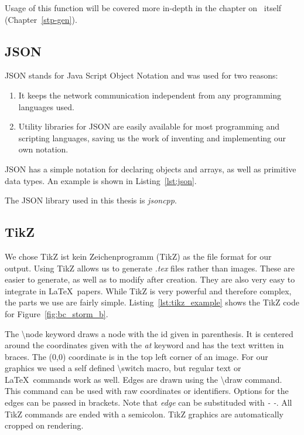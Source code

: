 Usage of this function will be covered more in-depth in the chapter on \tool\ itself (Chapter~\ref{stp-gen}).
\subsection*{JSON}
\label{json}
JSON stands for Java Script Object Notation and was used for two reasons:
\begin{enumerate}
    \item It keeps the network communication independent from any programming languages used.
    \item Utility libraries for JSON are easily available for most programming and scripting languages, saving us the work of inventing and implementing our own notation.
\end{enumerate}
JSON has a simple notation for declaring objects and arrays, as well as primitive data types.
An example is shown in Listing~\ref{lst:json}.

The JSON library used in this thesis is \textit{jsoncpp}\cite{jsoncpp}.

\subsection*{TikZ}
\label{tikz}
We chose TikZ ist kein Zeichenprogramm (TikZ)\cite{tikz} as the file format for our output.
Using TikZ allows us to generate \textit{.tex} files rather than images.
These are easier to generate, as well as to modify after creation.
They are also very easy to integrate in \LaTeX\ papers.
While TikZ is very powerful and therefore complex, the parts we use are fairly simple.
Listing~\ref{lst:tikz_example} shows the TikZ code for Figure~\ref{fig:bc_storm_b}.

The \textbackslash node keyword draws a node with the id given in parenthesis.
It is centered around the coordinates given with the \textit{at} keyword and has the text written in braces.
The (0,0) coordinate is in the top left corner of an image.
For our graphics we used a self defined \textbackslash switch macro, but regular text or \LaTeX\ commands work as well.
Edges are drawn using the \textbackslash draw command.
This command can be used with raw coordinates or identifiers.
Options for the edges can be passed in brackets.
Note that \textit{edge} can be substituded with \textit{- -}.
All TikZ commands are ended with a semicolon.
TikZ graphics are automatically cropped on rendering.

